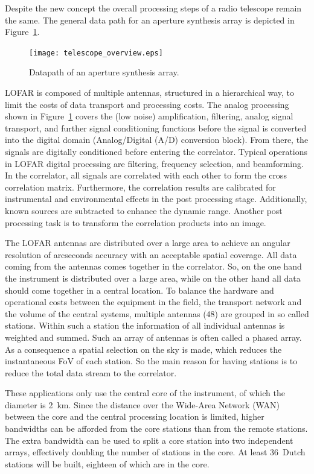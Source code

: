 \documentclass[journal]{IEEEtran}
\begin{document}
Despite the new concept the overall processing steps of a radio telescope remain the same. The general data path for an aperture synthesis array is depicted in Figure~\ref{fig:concept}.

\begin{figure}
\begin{center}
\texttt{[image: telescope\_overview.eps]}
\end{center}
\caption{Datapath of an aperture synthesis array.}
\label{fig:concept}
\end{figure}

LOFAR is composed of multiple antennas, structured in a hierarchical way,
to limit the costs of data transport and processing costs.
The analog processing shown in Figure~\ref{fig:concept} covers the (low noise)
amplification, filtering, analog signal transport, and further signal
conditioning functions before the signal is converted into the digital domain
(Analog/Digital (A/D) conversion block). From there, the signals are digitally conditioned before entering the correlator. Typical operations in LOFAR digital processing are filtering, frequency selection, and beamforming. In the correlator, all signals are correlated with each other to form the cross correlation matrix. Furthermore, the correlation results are calibrated for instrumental and environmental effects in the post processing stage. Additionally, known sources are subtracted to enhance the dynamic range. Another post processing task is to transform the correlation products into an image.

The LOFAR antennas are distributed over a large area to achieve an angular
resolution of arcseconds accuracy with an acceptable spatial coverage.
All data coming from the antennas comes together in the correlator.
So, on the one hand the instrument is distributed over a large area,
while on the other hand all data should come together in a central location. To balance the hardware and operational costs between the equipment in the field, the transport network and the volume of the central systems, multiple antennas (48) are grouped in so called stations. Within such a station the information of all individual antennas is weighted and summed. Such an array of antennas is often called a phased array. As a consequence a spatial selection on the sky is made, which reduces the instantaneous FoV of each station. So the main reason for having stations is to reduce the total data stream to the correlator.

These applications only use the central core of the instrument, of which the
diameter is 2~km.
Since the distance over the Wide-Area Network (WAN) between the core and the
central processing location is limited, higher bandwidths can be afforded from
the core stations than from the remote stations.
The extra bandwidth can be used to split a core station into two independent
arrays, effectively doubling the number of stations in the core.
At least 36~Dutch stations will be built, eighteen of which are in the core.
\end{document}
